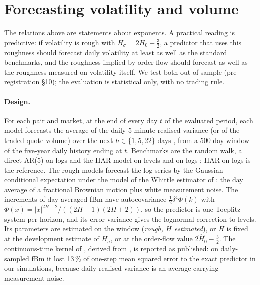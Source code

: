 \documentclass[11pt]{article}
\newcommand{\Hz}{H_0}
\begin{document}
\section{Forecasting volatility and volume}
\label{sec:forecast}
The relations above are statements about exponents. A practical reading is predictive: if
volatility is rough with $H_\sigma = 2\Hz - \tfrac32$, a predictor that uses this roughness
should forecast daily volatility at least as well as the standard benchmarks, and the
roughness implied by order flow should forecast as well as the roughness measured on
volatility itself. We test both out of sample (pre-registration \S10); the evaluation is
statistical only, with no trading rule.

\paragraph{Design.} For each pair and market, at the end of every day $t$ of the evaluated
period, each model forecasts the average of the daily 5-minute realised variance (or of
the traded quote volume) over the next $h \in \{1, 5, 22\}$ days \citep{corsi2009}, from a
500-day window of the five-year daily history ending at $t$. Benchmarks are the random
walk, a direct AR(5) on logs and the HAR model on levels and on logs
\citep{corsi2009,abd2007}; HAR on logs is the reference. The rough models forecast the log
series by the Gaussian conditional expectation under the model of the Whittle estimator of
\citet{fukasawa2022}: the day average of a fractional Brownian motion plus white
measurement noise. The increments of day-averaged fBm have autocovariance
$\tfrac12\delta^4\Phi(k)$ with $\Phi(x) = |x|^{2H+2}/((2H+1)(2H+2))$, so the predictor is one
Toeplitz system per horizon, and its error variance gives the lognormal correction to
levels. Its parameters are estimated on the window (\emph{rough, $H$ estimated}), or $H$ is
fixed at the development estimate of $H_\sigma$, or at the order-flow value $2\hat\Hz - \tfrac32$.
The continuous-time kernel of \citet[\S5]{gatheral2018}, derived from \citet{nuzman2000},
is reported as published: on daily-sampled fBm it lost 13\,\% of one-step mean squared
error to the exact predictor in our simulations, because daily realised variance is an
average carrying measurement noise.
\end{document}
